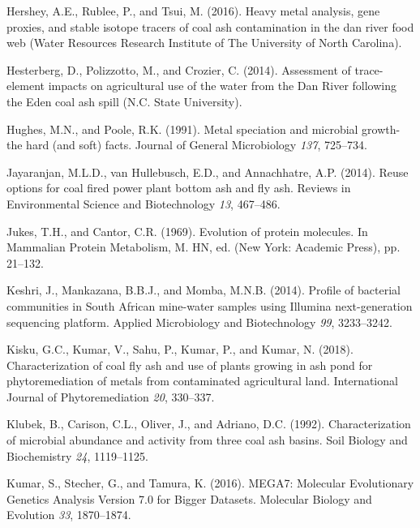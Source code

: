 \documentclass[ms, hidelinks]{uncgdissertationexp}
\theoremstyle{plain}
\theoremstyle{definition}
\theoremstyle{remark}
\begin{document}
\leavevmode\hypertarget{ref-hersheyHeavyMetalAnalysis2016}{}%
Hershey, A.E., Rublee, P., and Tsui, M. (2016). Heavy metal analysis, gene proxies, and stable isotope tracers of coal ash contamination in the dan river food web (Water Resources Research Institute of The University of North Carolina).

\leavevmode\hypertarget{ref-hesterbergAssessmentTraceelementImpacts2014}{}%
Hesterberg, D., Polizzotto, M., and Crozier, C. (2014). Assessment of trace-element impacts on agricultural use of the water from the Dan River following the Eden coal ash spill (N.C. State University).

\leavevmode\hypertarget{ref-hughesMetalSpeciationMicrobial1991}{}%
Hughes, M.N., and Poole, R.K. (1991). Metal speciation and microbial growth-the hard (and soft) facts. Journal of General Microbiology \emph{137}, 725--734.

\leavevmode\hypertarget{ref-jayaranjanReuseOptionsCoal2014}{}%
Jayaranjan, M.L.D., van Hullebusch, E.D., and Annachhatre, A.P. (2014). Reuse options for coal fired power plant bottom ash and fly ash. Reviews in Environmental Science and Biotechnology \emph{13}, 467--486.

\leavevmode\hypertarget{ref-jukesEvolutionProteinMolecules1969}{}%
Jukes, T.H., and Cantor, C.R. (1969). Evolution of protein molecules. In Mammalian Protein Metabolism, M. HN, ed. (New York: Academic Press), pp. 21--132.

\leavevmode\hypertarget{ref-keshriProfileBacterialCommunities2014}{}%
Keshri, J., Mankazana, B.B.J., and Momba, M.N.B. (2014). Profile of bacterial communities in South African mine-water samples using Illumina next-generation sequencing platform. Applied Microbiology and Biotechnology \emph{99}, 3233--3242.

\leavevmode\hypertarget{ref-kiskuCharacterizationCoalFly2018}{}%
Kisku, G.C., Kumar, V., Sahu, P., Kumar, P., and Kumar, N. (2018). Characterization of coal fly ash and use of plants growing in ash pond for phytoremediation of metals from contaminated agricultural land. International Journal of Phytoremediation \emph{20}, 330--337.

\leavevmode\hypertarget{ref-klubekCharacterizationMicrobialAbundance1992}{}%
Klubek, B., Carison, C.L., Oliver, J., and Adriano, D.C. (1992). Characterization of microbial abundance and activity from three coal ash basins. Soil Biology and Biochemistry \emph{24}, 1119--1125.

\leavevmode\hypertarget{ref-kumarMEGA7MolecularEvolutionary2016}{}%
Kumar, S., Stecher, G., and Tamura, K. (2016). MEGA7: Molecular Evolutionary Genetics Analysis Version 7.0 for Bigger Datasets. Molecular Biology and Evolution \emph{33}, 1870--1874.
\end{document}
